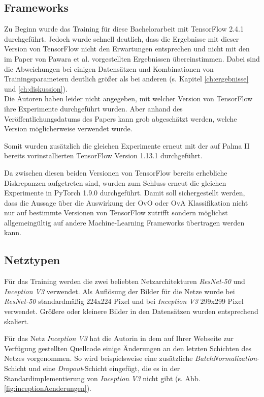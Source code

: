\subsection{Frameworks}
Zu Beginn wurde das Training für diese Bachelorarbeit mit TensorFlow 2.4.1 \cite{tensorflow} durchgeführt. Jedoch wurde schnell deutlich, dass die Ergebnisse mit dieser Version von TensorFlow nicht den Erwartungen entsprechen und nicht mit den im Paper von Pawara et al. \cite{pawaraPaper} vorgestellten Ergebnissen übereinstimmen. Dabei sind die Abweichungen bei einigen Datensätzen und Kombinationen von Trainingsparametern deutlich größer als bei anderen (s. Kapitel \ref{ch:ergebnisse} und \ref{ch:diskussion}). \\

Die Autoren haben leider nicht angegeben, mit welcher Version von TensorFlow \cite{tensorflow} ihre Experimente durchgeführt wurden. Aber anhand des Veröffentlichungsdatums des Papers \cite{pawaraPaper} kann grob abgeschätzt werden, welche Version möglicherweise verwendet wurde.

Somit wurden zusätzlich die gleichen Experimente erneut mit der auf Palma II \cite{palma2} bereits vorinstallierten TensorFlow \cite{tensorflow} Version 1.13.1 durchgeführt.

Da zwischen diesen beiden Versionen von TensorFlow \cite{tensorflow} bereits erhebliche Diskrepanzen aufgetreten sind, wurden zum Schluss erneut die gleichen Experimente in PyTorch 1.9.0 \cite{pytorch} durchgeführt.
Damit soll sichergestellt werden, dass die Aussage über die Auswirkung der OvO oder OvA Klassifikation nicht nur auf bestimmte Versionen von TensorFlow \cite{tensorflow} zutrifft sondern möglichst allgemeingültig auf andere Machine-Learning Frameworks übertragen werden kann.


\subsection{Netztypen}
\label{ch:methodik_netze}
Für das Training werden die zwei beliebten Netzarchitekturen \textit{ResNet-50} und \textit{Inception V3} verwendet. Als Auflösung der Bilder für die Netze wurde bei \textit{ResNet-50} standardmäßig 224x224 Pixel und bei \textit{Inception V3} 299x299 Pixel verwendet. Größere oder kleinere Bilder in den Datensätzen wurden entsprechend skaliert.

Für das Netz \textit{Inception V3} hat die Autorin in dem auf Ihrer Webseite zur Verfügung gestellten Quellcode \cite{pawaraWebsiteCode} einige Änderungen an den letzten Schichten des Netzes vorgenommen. So wird beispielsweise eine zusätzliche \textit{BatchNormalization}-Schicht und eine \textit{Dropout}-Schicht eingefügt, die es in der Standardimplementierung von \textit{Inception V3} nicht gibt (s. Abb. \ref{fig:inceptionAenderungen}).

